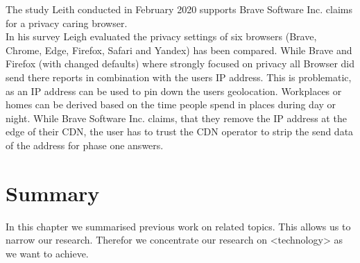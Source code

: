    The study Leith conducted in February 2020 \cite{leith_web_2020} supports Brave Software Inc. claims
    for a privacy caring browser.\\
    In his survey Leigh evaluated the privacy settings of six browsers (Brave, Chrome, Edge, Firefox, Safari and Yandex) has been compared. While Brave and Firefox (with changed defaults) where strongly focused on privacy all Browser did send there reports in combination with the users IP address\cite{leith_web_2020}.
    This is problematic, as an IP address can be used to pin down the users geolocation\cite{koch_geolocation_2013}. Workplaces or homes can be derived based on the time people spend in places during day or night. 
    While Brave Software Inc. claims, that they remove the IP address at the edge of their CDN, the user has to trust the CDN operator to strip the send data of the address for phase one answers.

\section{Summary}
In this chapter we summarised previous work on related topics. This allows us to narrow our research.
Therefor we concentrate our research on <technology> as we want to achieve.
%


  